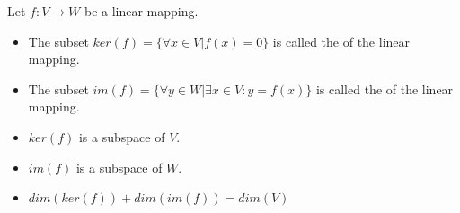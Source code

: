     \par Let $f: V \to W$ be a linear mapping.
    \begin{itemize}
      \item The subset $ker(f) = \{\forall x \in V | f(x) = 0 \}$ is called
        the  of the linear mapping.
      \item The subset $im(f) = \{\forall y \in W | \exists x \in V: y = f(x) \}$
        is called the  of the linear mapping.
    \end{itemize}
    \begin{itemize}
      \item $ker(f)$ is a subspace of $V$.
      \item $im(f)$ is a subspace of $W$.
      \item $dim(ker(f)) + dim(im(f)) = dim(V)$
    \end{itemize}
